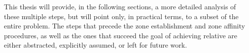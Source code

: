 This thesis will provide, in the following sections, a more detailed analysis of these multiple steps, but will point only, in practical terms, to a subset of the entire problem. The steps that precede the zone establishment and zone affinity procedures, as well as the ones that succeed the goal of achieving relative \pol{} are either abstracted, explicitly assumed, or left for future work.